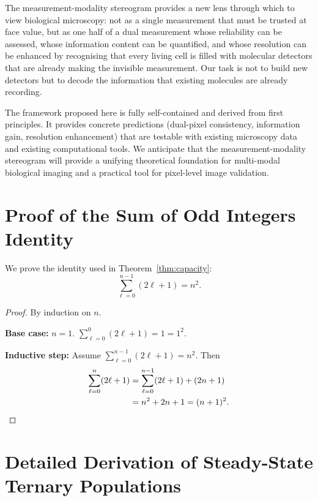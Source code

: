 \documentclass[11pt,twocolumn,a4paper]{article}
\begin{document}
The measurement-modality stereogram provides a new lens through which to view biological microscopy: not as a single measurement that must be trusted at face value, but as one half of a dual measurement whose reliability can be assessed, whose information content can be quantified, and whose resolution can be enhanced by recognising that every living cell is filled with molecular detectors that are already making the invisible measurement.
Our task is not to build new detectors but to decode the information that existing molecules are already recording.

The framework proposed here is fully self-contained and derived from first principles.
It provides concrete predictions (dual-pixel consistency, information gain, resolution enhancement) that are testable with existing microscopy data and existing computational tools.
We anticipate that the measurement-modality stereogram will provide a unifying theoretical foundation for multi-modal biological imaging and a practical tool for pixel-level image validation.


\appendix

\section{Proof of the Sum of Odd Integers Identity}\label{app:odd}

We prove the identity used in Theorem~\ref{thm:capacity}:
\begin{equation}
\sum_{\ell=0}^{n-1}(2\ell+1) = n^2.
\end{equation}

\begin{proof}
By induction on $n$.

\textbf{Base case:} $n = 1$. $\sum_{\ell=0}^{0}(2\ell+1) = 1 = 1^2$. \checkmark

\textbf{Inductive step:} Assume $\sum_{\ell=0}^{n-1}(2\ell+1) = n^2$. Then
\begin{align}
\sum_{\ell=0}^{n}(2\ell+1) &= \sum_{\ell=0}^{n-1}(2\ell+1) + (2n+1) \\
&= n^2 + 2n + 1 = (n+1)^2. \qedhere
\end{align}
\end{proof}


\section{Detailed Derivation of Steady-State Ternary Populations}\label{app:steady_state}
\end{document}
